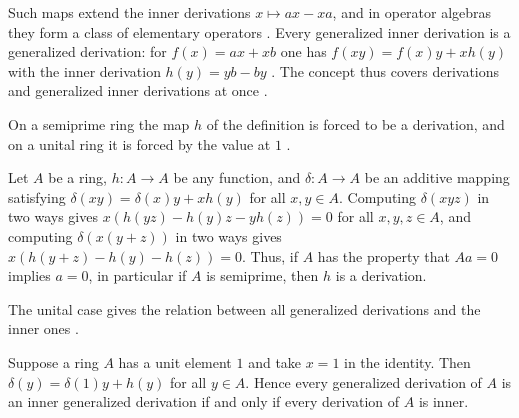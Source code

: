 Such maps extend the inner derivations $x\mapsto ax-xa$, and in operator
algebras they form a class of elementary operators \cite[p.~1147]{Hvala1998}.
Every generalized inner derivation is a generalized derivation: for
$f(x)=ax+xb$ one has $f(xy)=f(x)y+xh(y)$ with the inner derivation
$h(y)=yb-by$ \cite[p.~1147]{Hvala1998}. The concept thus covers derivations
and generalized inner derivations at once \cite[p.~1148]{Hvala1998}.

On a semiprime ring the map $h$ of the definition is forced to be a
derivation, and on a unital ring it is forced by the value at $1$
\cite[Remarks~1 and~2, p.~90]{Bresar1991Glasgow}.

\begin{remark}\label{rem:gen:h-is-derivation}
Let $A$ be a ring, $h\colon A\to A$ be any function, and
$\delta\colon A\to A$ be an additive mapping satisfying
$\delta(xy)=\delta(x)y+xh(y)$ for all $x,y\in A$. Computing $\delta(xyz)$ in
two ways gives $x(h(yz)-h(y)z-yh(z))=0$ for all $x,y,z\in A$, and computing
$\delta(x(y+z))$ in two ways gives $x(h(y+z)-h(y)-h(z))=0$. Thus, if $A$ has
the property that $Aa=0$ implies $a=0$, in particular if $A$ is semiprime,
then $h$ is a derivation.
\end{remark}

The unital case gives the relation between all generalized derivations and
the inner ones \cite[p.~90]{Bresar1991Glasgow}.

\begin{remark}\label{rem:gen:unital}
Suppose a ring $A$ has a unit element $1$ and take $x=1$ in the identity.
Then $\delta(y)=\delta(1)y+h(y)$ for all $y\in A$. Hence every generalized
derivation of $A$ is an inner generalized derivation if and only if every
derivation of $A$ is inner.
\end{remark}

